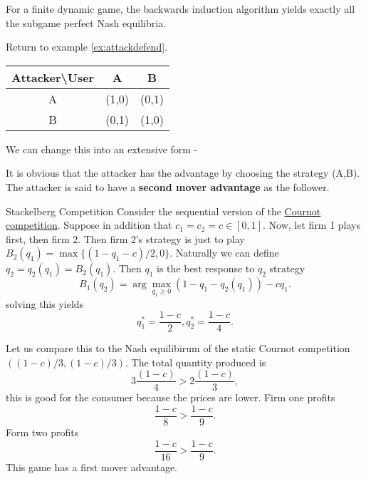 \begin{atheorem}{}{}
    For a finite dynamic game, the backwards induction algorithm yields exactly all the subgame perfect Nash equilibria.
\end{atheorem}
\begin{aexample}{}{}
    Return to example \ref{ex:attackdefend}.
    \begin{center}
        \begin{tabular}{|c|c c|} 
            \hline
            Attacker\textbackslash User & A&B \\ 
            \hline
            A & (1,0) & (0,1)\\ 
            \hline
            B & (0,1)&(1,0)\\
            \hline
        \end{tabular}
    \end{center}
    We can change this into an extensive form - 
    \begin{center}
        \end{center}
    It is obvious that the attacker has the advantage by choosing the strategy (A,B). The attacker is said to have a \textbf{second mover advantage} as the follower.
\end{aexample}
\begin{aexample}{Stackelberg Competition}{}
    Consider the sequential version of the \hyperref[ex:cournot]{Cournot competition}. Suppose in addition that $c_1=c_2=c\in [0,1]$. Now, let firm 1 plays first, then firm 2.
    Then firm 2's strategy is just to play $B_2(q_1) =  \max\{(1-q_1-c)/2,0\}.$ Naturally we can define $q_2= q_2(q_1)= B_2(q_1).$
    Then $q_1$ is the best response to $q_2$ strategy\[
    B_1(q_2) = \arg\max_{q_1\geq 0} (1-q_1-q_2(q_1))-cq_1. 
\]
solving this yields\[
q_1^*=\frac{1-c}{2},q_2^*=\frac{1-c}{4}.\]
\end{aexample}
Let us compare this to the Nash equilibirum of the static Cournot competition $((1-c)/3,(1-c)/3)$. 
The total quantity produced is \[
3\frac{(1-c)}{4} > 2\frac{(1-c)}{3},
\]
this is good for the consumer because the prices are lower. 
Firm one profits \[
\frac{1-c}{8} > \frac{1-c}{9}.
\]
Form two profits \[
\frac{1-c}{16} > \frac{1-c}{9}.
\]
This game has a first mover advantage. 

